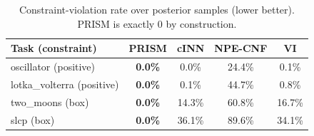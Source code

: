 \begin{table}[t]
\centering
\caption{Constraint-violation rate over posterior samples (lower better). PRISM is exactly 0 by construction.}
\label{tab:constraints}
\begin{tabular}{lcccc}
\toprule
Task (constraint) & PRISM & cINN & NPE-CNF & VI \\
\midrule
oscillator (positive) & \textbf{0.0\%} & 0.0\% & 24.4\% & 0.1\% \\
lotka\_volterra (positive) & \textbf{0.0\%} & 0.1\% & 44.7\% & 0.8\% \\
two\_moons (box) & \textbf{0.0\%} & 14.3\% & 60.8\% & 16.7\% \\
slcp (box) & \textbf{0.0\%} & 36.1\% & 89.6\% & 34.1\% \\
\bottomrule
\end{tabular}
\end{table}
